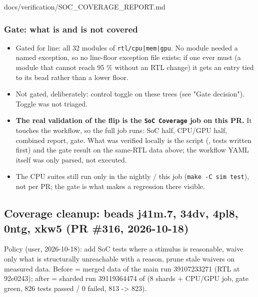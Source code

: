 \begin{relocated}{docs/verification/SOC_COVERAGE_REPORT.md}
\subsubsection{Gate: what is and is not covered}\label{tm:flow:soc-coverage-report:gate-what-is-and-is-not-covered}

\begin{itemize}
\tightlist
\item
  Gated for line: all 32 modules of
  \texttt{rtl/\allowbreak{}cpu|mem|gpu}. No module needed a named
  exception, so no line-floor exception file exists; if one ever must (a
  module that cannot reach 95 \% without an RTL change) it gets an entry
  tied to its bead rather than a lower floor.
\item
  Not gated, deliberately: control toggle on these trees (see "Gate
  decision"). Toggle was not triaged.
\item
  \textbf{The real validation of the flip is the \texttt{SoC\ Coverage}
  job on this PR.} It touches the workflow, so the full job runs: SoC
  half, CPU/GPU half, combined report, gate. What was verified locally
  is the script (, tests written
  first) and the gate result on the same-RTL data above; the workflow
  YAML itself was only parsed, not executed.
\item
  The CPU suites still run only in the nightly / this job
  (\texttt{make\ -\allowbreak{}C\ sim\ test}), not per PR; the gate is
  what makes a regression there visible.
\end{itemize}

\subsection{Coverage cleanup: beads j41m.7, 34dv, 4pl8, 0ntg, xkw5 (PR
\#316, 2026-10-18)}\label{tm:flow:soc-coverage-report:coverage-cleanup-beads-j41m7-34dv-4pl8-0ntg-xkw5-pr-316-2026-10-18}

Policy (user, 2026-10-18): add SoC tests where a stimulus is reasonable,
waive only what is structurally unreachable with a reason, prune stale
waivers on measured data. Before = merged data of the main
 run 39107233271 (RTL at 92e0243); after = sharded
run 39119364474 of  (8 shards + CPU/GPU job, gate green, 826
tests passed / 0 failed,  813 -\textgreater{} 823).


\end{relocated}
